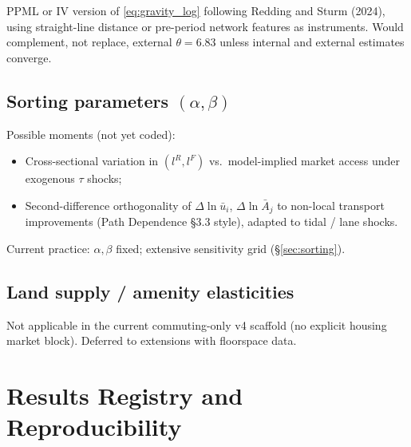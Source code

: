 \documentclass[11pt]{article}
\newcommand{\ubar}{\bar u}
\newcommand{\Abar}{\bar A}
\begin{document}
PPML or IV version of \eqref{eq:gravity_log} following Redding and Sturm
(2024), using straight-line distance or pre-period network features as
instruments.  Would complement, not replace, external $\theta=6.83$ unless
internal and external estimates converge.

\subsection{Sorting parameters $(\alpha,\beta)$}

Possible moments (not yet coded):
\begin{itemize}[leftmargin=2em]
  \item Cross-sectional variation in $(l^R,l^F)$ vs.\ model-implied
        market access under exogenous $\tau$ shocks;
  \item Second-difference orthogonality of $\Delta\ln\ubar_i$,
        $\Delta\ln\Abar_j$ to non-local transport improvements (Path
        Dependence \S3.3 style), adapted to tidal / lane shocks.
\end{itemize}
Current practice: $\alpha,\beta$ fixed; extensive sensitivity grid
(\S\ref{sec:sorting}).

\subsection{Land supply / amenity elasticities}

Not applicable in the current commuting-only v4 scaffold (no explicit
housing market block).  Deferred to extensions with floorspace data.

\section{Results Registry and Reproducibility}\label{sec:registry}
\end{document}
